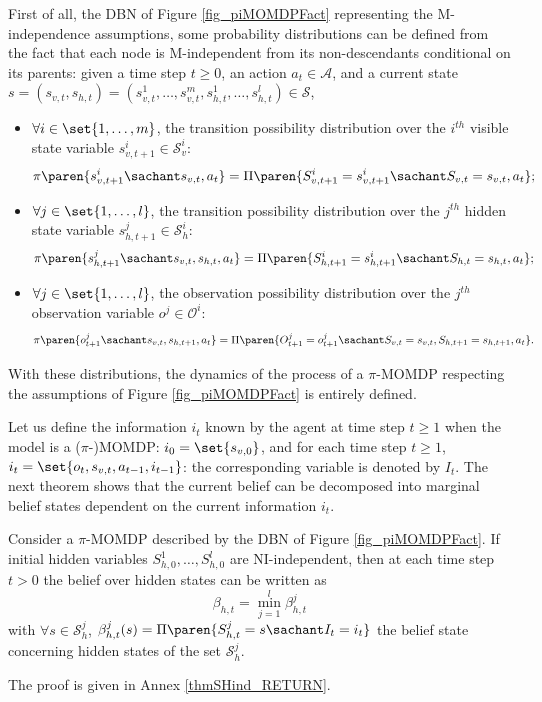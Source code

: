 First of all, the DBN of Figure \ref{fig_piMOMDPFact} representing the M-independence assumptions,
some probability distributions can be defined from the fact that each node is M-independent from its non-descendants
conditional on its parents: given a time step $t \geqslant0$, an action $a_t \in \mathcal{A}$,
and a current state $s = (s_{v,t},s_{h,t}) = (s^1_{v,t},\ldots, s^m_{v,t}, s^1_{h,t}, \ldots, s^l_{h,t}) \in \mathcal{S}$,
\begin{itemize}
\item $\forall i \in \set{ 1,\ldots,m }$, 
the transition possibility distribution over the $i^{th}$ visible state variable $s^i_{v,t+1} \in \mathcal{S}^i_v$: 
\begin{equation}
\label{EQ_possV}
\pi \paren{ s^i_{v,t+1} \sachant s_{v,t}, a_t } = \Pi \paren{ S^i_{v,t+1} = s^i_{v,t+1} \sachant S_{v,t} = s_{v,t}, a_t   };
\end{equation}
\item $\forall j \in \set{ 1,\ldots,l }$, 
the transition possibility distribution over the $j^{th}$ hidden state variable $s^j_{h,t+1} \in \mathcal{S}^i_h$: 
\begin{equation}
\label{EQ_possH}
\pi \paren{ s^j_{h,t+1} \sachant s_{v,t}, s_{h,t}, a_t } = \Pi \paren{ S^i_{h,t+1} = s^i_{h,t+1} \sachant S_{h,t} = s_{h,t}, a_t   } ;
\end{equation}
\item $\forall j \in \set{ 1,\ldots,l }$, 
the observation possibility distribution over the $j^{th}$ observation variable $o^j \in \mathcal{O}^i$: 
\begin{equation}
\label{EQ_possO}
\pi \paren{ o^j_{t+1} \sachant s_{v,t}, s_{h,t+1}, a_t } = \Pi \paren{ O^j_{t+1} = o^j_{t+1} \sachant S_{v,t} = s_{v,t}, S_{h,t+1} = s_{h,t+1}, a_t }.
\end{equation}
\end{itemize}
With these distributions, the dynamics of the process of a $\pi$-MOMDP
respecting the assumptions of Figure \ref{fig_piMOMDPFact}
is entirely defined.


Let us define the information $i_t$ known by the agent at time step $t \geqslant 1$
when the model is a ($\pi$-)MOMDP:
$i_0 = \set{ s_{v,0} }$, and
for each time step $t \geqslant 1$, 
$i_t = \set{ o_t,s_{v,t},a_{t-1},i_{t-1} }$:
the corresponding variable is denoted by $I_t$.
The next theorem shows that the current belief can be decomposed into 
marginal belief states dependent on the current information $i_t$.
\begin{theorem}
\label{thmSHind} 
Consider a $\pi$-MOMDP described by the DBN of Figure \ref{fig_piMOMDPFact}.
If initial hidden variables $S^1_{h,0}, \ldots,S^l_{h,0}$ are NI-independent, then at each time step $t>0$ 
the belief over hidden states can be written as 
\[ \beta_{h,t} = \displaystyle \min_{j=1}^{l} \beta^j_{h,t}\]
with $\forall s \in \mathcal{S}^j_h$, $\beta^j_{h,t}(s) = \Pi \paren{ S^j_{h,t} = s \sachant I_t = i_t }$ the belief state 
concerning hidden states of the set $\mathcal{S}^j_h$.
\end{theorem}
The proof is given in Annex \ref{thmSHind_RETURN}.

